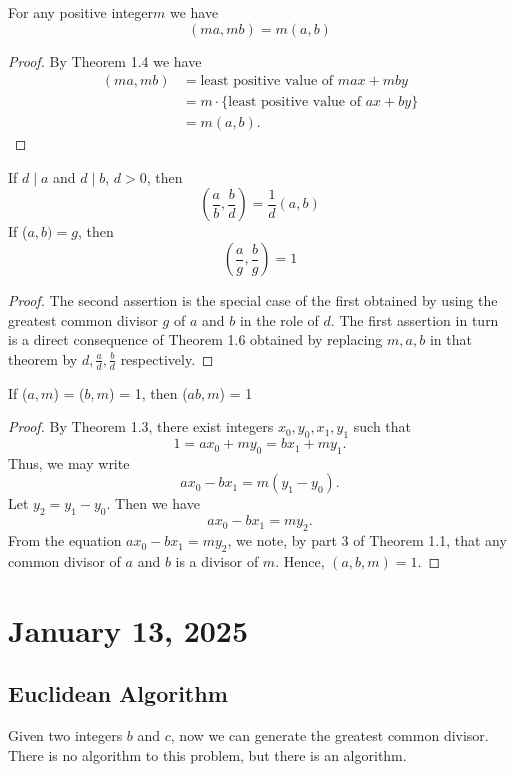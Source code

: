 \documentclass[11pt]{article}
\begin{document}
\begin{theorem}
    For any positive integer\(m\) we have \[(ma, mb) = m(a, b)\]
\end{theorem}

\begin{proof}
    By Theorem 1.4 we have
    \begin{align*}
        (ma, mb) & = \text{least positive value of } max + mby           \\
                 & = m \cdot \{\text{least positive value of } ax + by\} \\
                 & = m(a, b).
    \end{align*}
\end{proof}
\begin{theorem}
    If \(d \mid a\) and \(d \mid b\), \(d > 0\), then \[(\frac{a}{b}, \frac{b}{d} ) = \frac{1}{d}(a, b)\]
    If (\(a, b) = g\), then \[(\frac{a}{g}, \frac{b}{g}) = 1\]
\end{theorem}

\begin{proof}
    The second assertion is the special case of the first obtained by using the greatest common divisor \(g\) of \(a\) and \(b\) in the role of \(d\). The first assertion in turn is a direct consequence of Theorem 1.6 obtained by replacing \(m, a, b\) in that theorem by \(d, \frac{a}{d}, \frac{b}{d}\) respectively.
\end{proof}

\begin{theorem}
    If (\(a, m\)) = (\(b, m\)) = 1, then (\(ab, m\)) = 1
\end{theorem}
\begin{proof}
    By Theorem 1.3, there exist integers \(x_0, y_0, x_1, y_1\) such that
    \[1 = ax_0 + my_0 = bx_1 + my_1.\]
    Thus, we may write
    \[
        a x_0 - b x_1 = m (y_1 - y_0).
    \]
    Let \(y_2 = y_1 - y_0\). Then we have
    \[
        a x_0 - b x_1 = m y_2.
    \]
    From the equation \(a x_0 - b x_1 = m y_2\), we note, by part 3 of Theorem 1.1,
    that any common divisor of \(a\) and \(b\) is a divisor of \(m\). Hence, \((a,
    b, m) = 1\).
\end{proof}
\section{January 13, 2025}
\subsection{Euclidean Algorithm}
Given two integers \(b\) and \(c\), now we can generate the greatest common
divisor. There is no algorithm to this problem, but there is an algorithm.
\end{document}
